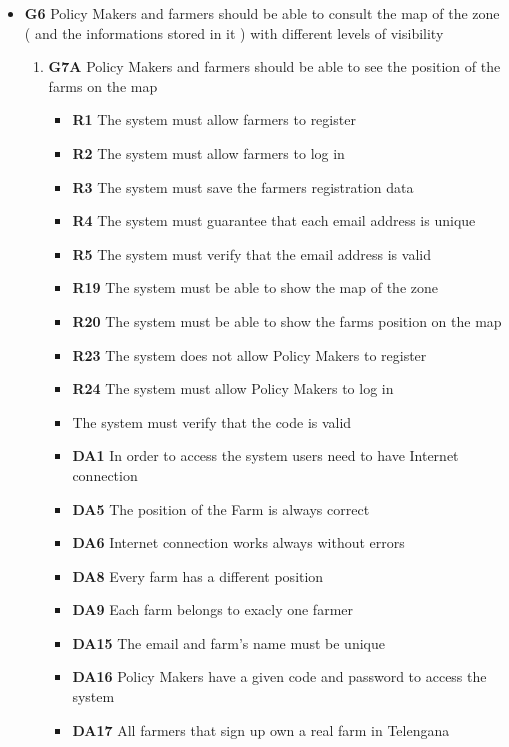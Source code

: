\begin{itemize}
\item \textbf{G6} Policy Makers and farmers should be able to consult the map of the zone ( and the informations stored in it ) with different levels of visibility
    \begin{enumerate}
        \item \textbf{G7A} Policy Makers and farmers should be able to see the position of the farms on the map
        \begin{itemize}
            \renewcommand\labelitemi{--}
            \item\textbf{R1} The system must allow farmers to register
            \item\textbf{R2} The system must allow farmers to log in
            \item\textbf{R3} The system must save the farmers registration data
            \item\textbf{R4} The system must guarantee that each email address is unique
            \item\textbf{R5} The system must verify that the email address is valid
            \item\textbf{R19} The system must be able to show the map of the zone
            \item\textbf{R20} The system must be able to show the farms position on the map
            \item\textbf{R23} The system does not allow Policy Makers to register
            \item\textbf{R24} The system must allow Policy Makers to log in
            \item\textbf{} The system must verify that the code is valid
            \item\textbf{DA1} In order to access the system users need to have Internet connection
            \item\textbf{DA5} The position of the Farm is always correct
            \item\textbf{DA6} Internet connection works always without errors
            \item \textbf{DA8} Every farm has a different position
            \item \textbf{DA9} Each farm belongs to exacly one farmer
            \item \textbf{DA15} The email and farm's name must be unique
            \item \textbf{DA16} Policy Makers have a given code and password to access the system
            \item \textbf{DA17} All farmers that sign up own a real farm in Telengana

\end{itemize}
\end{enumerate}
\end{itemize}
